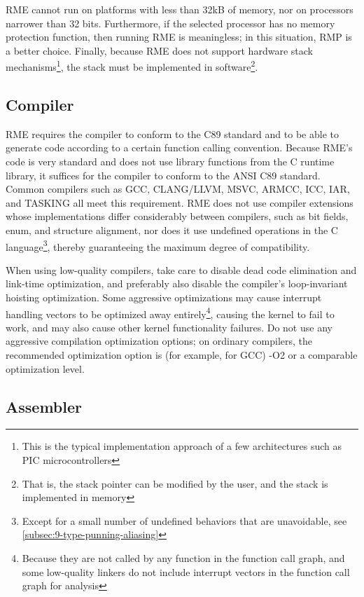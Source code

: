 RME cannot run on platforms with less than 32kB of memory, nor on processors narrower than 32 bits. Furthermore, if the selected processor has no memory protection function, then running RME is meaningless; in this situation, RMP is a better choice. Finally, because RME does not support hardware stack mechanisms\footnote{This is the typical implementation approach of a few architectures such as PIC microcontrollers}, the stack must be implemented in software\footnote{That is, the stack pointer can be modified by the user, and the stack is implemented in memory}.

\subsection{Compiler}\label{subsec:7-compiler}

RME requires the compiler to conform to the C89 standard and to be able to generate code according to a certain function calling convention. Because RME's code is very standard and does not use library functions from the C runtime library, it suffices for the compiler to conform to the ANSI C89 standard. Common compilers such as GCC, CLANG/LLVM, MSVC, ARMCC, ICC, IAR, and TASKING all meet this requirement. RME does not use compiler extensions whose implementations differ considerably between compilers, such as bit fields, enum, and structure alignment, nor does it use undefined operations in the C language\footnote{Except for a small number of undefined behaviors that are unavoidable, see \ref{subsec:9-type-punning-aliasing}}, thereby guaranteeing the maximum degree of compatibility.

When using low-quality compilers, take care to disable dead code elimination and link-time optimization, and preferably also disable the compiler's loop-invariant hoisting optimization. Some aggressive optimizations may cause interrupt handling vectors to be optimized away entirely\footnote{Because they are not called by any function in the function call graph, and some low-quality linkers do not include interrupt vectors in the function call graph for analysis}, causing the kernel to fail to work, and may also cause other kernel functionality failures. Do not use any aggressive compilation optimization options; on ordinary compilers, the recommended optimization option is (for example, for GCC) -O2 or a comparable optimization level.

\subsection{Assembler}\label{subsec:7-assembler}

